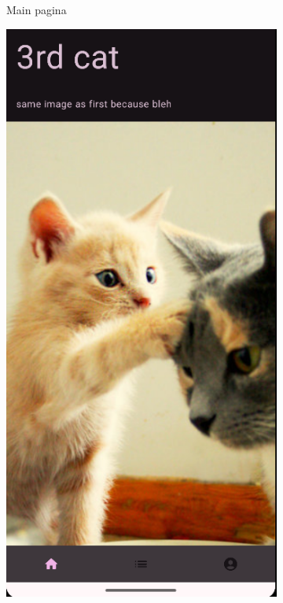 \documentclass{report}
\begin{document}
\begin{figure}[h]
\begin{subfigure}[b]{0.32\textwidth}
        \caption{Main pagina}
    \end{subfigure}
    \hfill
    \begin{subfigure}[b]{0.32\textwidth}
        \includegraphics[width=\textwidth]{DEMO_Main2.png} 

\end{subfigure}
\end{figure}
\end{document}
